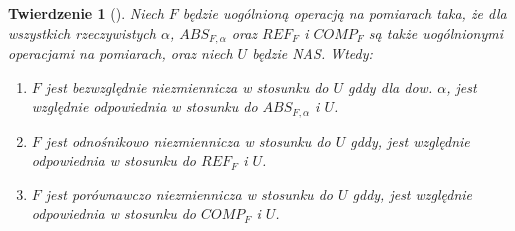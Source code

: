 \documentclass[12pt,a4paper]{report}
\newtheorem{tw}[definition]{Twierdzenie}
\begin{document}
\begin{tw} [{\citep[Tw. 3]{adams1965theory}}]
Niech $F$ będzie uogólnioną operacją na pomiarach taka, że dla wszystkich rzeczywistych $\alpha$, $ABS_{F,\alpha}$ oraz $REF_{F}$ i $COMP_{F}$ są także uogólnionymi operacjami na pomiarach, oraz niech $U$ będzie NAS. Wtedy:
\begin{enumerate}
\item
$F$ jest bezwzględnie niezmiennicza w stosunku do $U$ gddy dla dow. $\alpha$, jest względnie odpowiednia w stosunku do $ABS_{F,\alpha}$ i $U$.
\item
$F$ jest odnośnikowo niezmiennicza w stosunku do $U$ gddy, jest względnie odpowiednia w stosunku do $REF_{F}$ i $U$.  
\item
$F$ jest porównawczo niezmiennicza w stosunku do $U$ gddy, jest względnie odpowiednia w stosunku do $COMP_{F}$ i $U$.    
\end{enumerate}
\end{tw}
\end{document}
